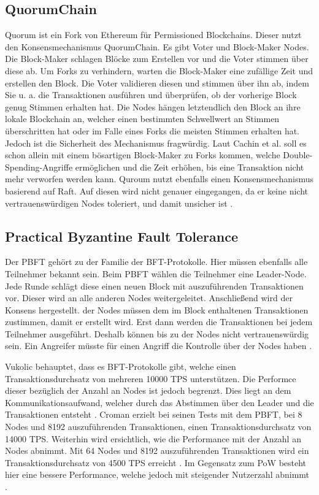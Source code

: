 \subsection{QuorumChain}
Quorum ist ein Fork von Ethereum für Permissioned Blockchains. Dieser nutzt den Konsensmechanismus QuorumChain. Es gibt Voter und Block-Maker Nodes. Die Block-Maker schlagen Blöcke zum Erstellen vor und die Voter stimmen über diese ab. Um Forks zu verhindern, warten die Block-Maker eine zufällige Zeit und erstellen den Block. Die Voter validieren diesen und stimmen über ihn ab, indem Sie u. a. die Transaktionen ausführen und überprüfen, ob der vorherige Block genug Stimmen erhalten hat. Die Nodes hängen letztendlich den Block an ihre lokale Blockchain an, welcher einen bestimmten Schwellwert an Stimmen überschritten hat oder im Falle eines Forks die meisten Stimmen erhalten hat. Jedoch ist die Sicherheit des Mechanismus fragwürdig. Laut Cachin et al. soll es schon allein mit einem bösartigen Block-Maker zu Forks kommen, welche Double-Spending-Angriffe ermöglichen und die Zeit erhöhen, bis eine Transaktion nicht mehr verworfen werden kann. Quroum nutzt ebenfalls einen Konsensmechanismus basierend auf Raft. Auf diesen wird nicht genauer eingegangen, da er keine nicht vertrauenswürdigen Nodes toleriert, und damit unsicher ist \cite{CachinBlockchainConsensusProtocols2017}.

\subsection{Practical Byzantine Fault Tolerance}
Der \acs{PBFT} gehört zu der Familie der \acs{BFT}-Protokolle. Hier müssen ebenfalls alle Teilnehmer bekannt sein. Beim \acs{PBFT} wählen die Teilnehmer eine Leader-Node. Jede Runde schlägt diese einen neuen Block mit auszuführenden Transaktionen vor. Dieser wird an alle anderen Nodes weitergeleitet. Anschließend wird der Konsens hergestellt.  der Nodes müssen dem im Block enthaltenen Transaktionen zustimmen, damit er erstellt wird. Erst dann werden die Transaktionen bei jedem Teilnehmer ausgeführt. Deshalb können bis zu  der Nodes nicht vertrauenswürdig sein. Ein Angreifer müsste für einen Angriff die Kontrolle über  der Nodes haben \cite{SukhwaniPerformanceModelingPBFT2017a}\cite{ZhengBlockchainChallengesOpportunities2017}. 

Vukolic behauptet, dass es \acs{BFT}-Protokolle gibt, welche einen Transaktionsdurchsatz von mehreren 10000 \acs{TPS} unterstützen. Die Performce dieser bezüglich der Anzahl an Nodes ist jedoch begrenzt. Dies liegt an dem Kommunikationsaufwand, welcher durch das Abstimmen über den Leader und die Transaktionen entsteht \cite{Vukolicquestscalableblockchain2015}. Croman erzielt bei seinen Tests mit dem \acs{PBFT}, bei 8 Nodes und 8192 auszuführenden Transaktionen, einen Transaktionsdurchsatz von 14000 \acs{TPS}. Weiterhin wird ersichtlich, wie die Performance mit der Anzahl an Nodes abnimmt. Mit 64 Nodes und 8192 auszuführenden Transaktionen wird ein Transaktionsdurchsatz von 4500 \acs{TPS} erreicht \cite{CromanScalingDecentralizedBlockchains2016}. Im Gegensatz zum \acs{PoW} besteht hier eine bessere Performance, welche jedoch mit steigender Nutzerzahl abnimmt \cite{Vukolicquestscalableblockchain2015}.

